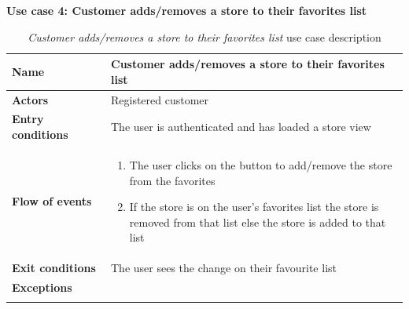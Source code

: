 \clearpage
\textbf{Use case 4: Customer adds/removes a store to their favorites list}
\smallskip
{}
\begin{longtable}{p{0.25\linewidth}p{0.75\linewidth}}
    \toprule
    \textbf{Name}             & \textbf{Customer adds/removes a store to their favorites list} \\
    \midrule
    \textbf{Actors}           & Registered customer                                            \\
    \midrule
    \textbf{Entry conditions} & The user is authenticated and has loaded a store view          \\
    \midrule
    \textbf{Flow of events}   &
    \begin{enumerate}
        \item The user clicks on the button to add/remove the store from the favorites
        \item If the store is on the user's favorites list the store is removed from that list else the store is added to that list
    \end{enumerate}                                                                 \\
    \midrule
    \textbf{Exit conditions}  & The user sees the change on their favourite list               \\
    \midrule
    \textbf{Exceptions}       &                                                                \\
    \bottomrule
    \caption{\emph{Customer adds/removes a store to their favorites list} use case description}
\end{longtable}


